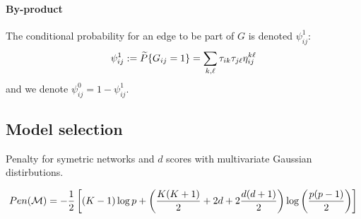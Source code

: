 \paragraph{By-product}
The conditional probability for an edge to be part of $G$ is denoted $\psi_{ij}^1$:
$$
\psi_{ij}^1 := \widetilde{P}\{G_{ij} = 1\} = \sum_{k, \ell} \tau_{ik} \tau_{j\ell} \eta^{k\ell}_{ij} 
$$
and we denote $\psi_{ij}^0 = 1 - \psi_{ij}^1$.



\subsection{Model selection}

Penalty for symetric networks and $d$ scores with multivariate Gaussian distirbutions. 


$$ Pen(\mathcal{M}) = -\frac{1}{2}\left[ (K-1)\log p + \left(\frac{K(K+1)}{2} + 2 d + 2 \frac{d (d+1)}{2} \right) \log\left(\frac{p(p-1)}{2}\right)  \right]  $$ 

